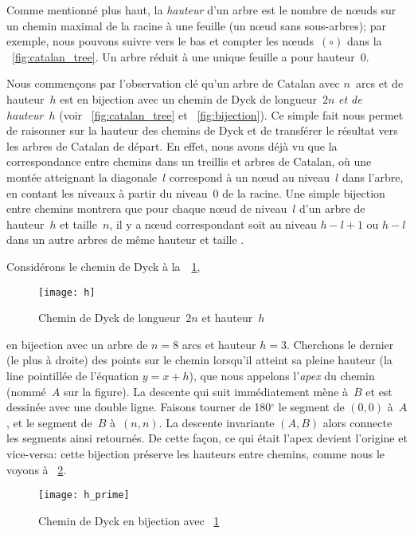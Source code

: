 Comme mentionné plus haut, la \emph{hauteur} d'un arbre est le nombre
de nœuds sur un chemin maximal de la racine à une feuille (un nœud
sans sous-arbres); par exemple, nous pouvons suivre vers le bas et
compter les nœuds~\((\circ)\) dans la \fig~\ref{fig:catalan_tree}. Un
arbre réduit à une unique feuille a pour hauteur~\(0\).

Nous commençons par l'observation clé qu'un arbre de Catalan avec
\(n\)~arcs et de hauteur~\(h\) est en bijection avec un chemin de Dyck
de longueur~\(2n\) \emph{et de hauteur~\(h\)} (voir
\fig~\vref{fig:catalan_tree} et \fig~\ref{fig:bijection}). Ce simple
fait nous permet de raisonner sur la hauteur des chemins de Dyck et de
transférer le résultat vers les arbres de Catalan de départ. En effet,
nous avons déjà vu que la correspondance entre chemins dans un
treillis et arbres de Catalan, où une montée atteignant la
diagonale~\(l\) correspond à un nœud au niveau~\(l\) dans l'arbre, en
contant les niveaux à partir du niveau~\(0\) de la racine. Une simple
bijection entre chemins montrera que pour chaque nœud de niveau~\(l\)
d'un arbre de hauteur~\(h\) et taille~\(n\), il y a nœud correspondant
soit au niveau \(h-l+1\) ou \(h-l\) dans un autre arbres de même
hauteur et taille \citep{Rinderknecht_2013d}.

Considérons le chemin de Dyck à la~\Fig~\ref{fig:h},
\begin{figure}
\centering
\texttt{[image: h]}
\caption{Chemin de Dyck de longueur~\(2n\) et hauteur~\(h\)}
\label{fig:h}
\end{figure}
en bijection avec un arbre de \(n=8\) arcs et hauteur
\(h=3\). Cherchons le dernier (le plus à droite) des points sur le
chemin lorsqu'il atteint sa pleine hauteur (la line pointillée de
l'équation \(y = x + h\)), que nous appelons l'\emph{apex} du chemin
(nommé~\(A\) sur la figure). La descente qui suit immédiatement mène
à~\(B\) et est dessinée avec une double ligne. Faisons tourner de
180$^\circ$ le segment de $(0,0)$ à~$A$, et le segment de~$B$
à~$(n,n)$. La descente invariante $(A,B)$ alors connecte les segments
ainsi retournés. De cette façon, ce qui était l'apex devient l'origine
et vice-versa: cette bijection préserve les hauteurs entre chemins,
comme nous le voyons à \fig~\ref{fig:h_prime}.
\begin{figure}
\centering
\texttt{[image: h\_prime]}
\caption{Chemin de Dyck en bijection avec \fig~\ref{fig:h}}
\label{fig:h_prime}
\end{figure}

